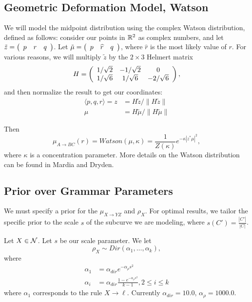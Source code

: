 \subsection{Geometric Deformation Model, Watson}
 We will model the midpoint distribution
using the complex Watson distribution, defined as follows: consider
our points in $\mathbb{R}^2$ as complex numbers, and let $\tilde{z} =
\left(\begin{array}{c c c} p& r& q\end{array}\right)$.  Let
  $\tilde{\mu} = \left(\begin{array}{c c c} p& \widehat{r} &
    q\end{array}\right)$, where $\widehat{r}$ is the most likely value
    of $r$. For various reasons, we will multiply $\tilde{z}$ by the
    $2\times 3$ Helmert matrix
$$H = \left(\begin{array}{c c c} 1/\sqrt{2} & -1/\sqrt{2} & 0
  \\ 1/\sqrt{6} & 1/\sqrt{6} & -2/\sqrt{6}\end{array}\right), $$ and
then normalize the result to get our coordinates:
\begin{align*}
\langle p, q, r\rangle = z &= H\tilde{z} / \|H\tilde{z}\| \\
\mu &= H\tilde{\mu} / \|H\tilde{\mu}\|
\end{align*}

Then
$$\mu_{A\to BC}(r) = Watson(\mu,\kappa) =
\frac{1}{Z(\kappa)}e^{-\kappa |z^*\mu|^2},$$ where $\kappa$ is a
concentration parameter. More details on the Watson distribution can
be found in Mardia and Dryden.

\subsection{Prior over Grammar Parameters}
\label{sec-prior-param}


We must specify a prior for the $\mu_{X\to YZ}$ and $\rho_X$.  For
optimal results, we tailor the specific prior to the scale $s$ of the
subcurve we are modeling, where $s(C') = \frac{|C'|}{|C|}$.

Let $X\in {\mathcal N}$. Let $s$ be our scale parameter. We let
$$\rho_X \sim Dir(\alpha_1, \dots, \alpha_k),$$
where
\begin{align*}
\alpha_1 &= \alpha_{dir} e^{- \alpha_{\rho} s^2} \\
\alpha_i &= \alpha_{dir} \frac{1 - e^{- \alpha_{\rho}s^2}}{k-1}, 2\le i\le k
\end{align*}
where $\alpha_1$ corresponds to the rule $X\to \ell$.
Currently $\alpha_{dir} = 10.0$, $\alpha_\rho = 1000.0$.

